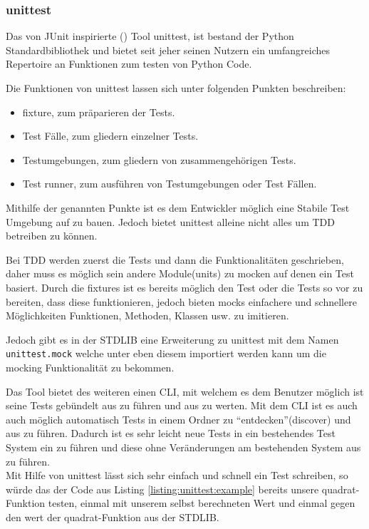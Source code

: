\subsubsection{unittest}\label{python-tools:unittest}

Das von JUnit inspirierte (\cite{docs.python:unittest}) Tool unittest, ist bestand
der Python Standardbibliothek und bietet seit jeher seinen Nutzern ein umfangreiches
Repertoire an Funktionen zum testen von Python Code.

Die Funktionen von unittest lassen sich unter folgenden Punkten beschreiben:
\begin{itemize}
    \item \Gls{fixture}, zum präparieren der Tests.
    \item Test Fälle, zum gliedern einzelner Tests.
    \item Testumgebungen, zum gliedern von zusammengehörigen Tests.
    \item Test runner, zum ausführen von Testumgebungen oder Test Fällen.
\end{itemize}

Mithilfe der genannten Punkte ist es dem Entwickler möglich eine Stabile Test Umgebung
auf zu bauen. Jedoch bietet unittest alleine nicht alles um TDD betreiben zu können.

Bei TDD werden zuerst die Tests und dann die Funktionalitäten geschrieben, daher
muss es möglich sein andere Module(units) zu \gls{mock}en auf denen ein Test basiert.
Durch die \Glspl{fixture} ist es bereits möglich den Test oder die Tests so vor zu
bereiten, dass diese funktionieren, jedoch bieten \Glspl{mock} einfachere und
schnellere Möglichkeiten Funktionen, Methoden, Klassen usw. zu imitieren.

Jedoch gibt es in der STDLIB eine Erweiterung zu unittest mit dem Namen
\lstinline|unittest.mock| welche unter eben diesem importiert werden kann um die \gls{mock}ing Funktionalität
zu bekommen.

Das Tool bietet des weiteren einen CLI, mit welchem es dem Benutzer möglich ist
seine Tests gebündelt aus zu führen und aus zu werten. Mit dem CLI ist es auch
auch möglich automatisch Tests in einem Ordner zu "`entdecken"'(discover) und
aus zu führen. Dadurch ist es sehr leicht neue Tests in ein bestehendes Test
System ein zu führen und diese ohne Veränderungen am bestehenden System aus zu
führen.
\newline
\\
Mit Hilfe von unittest lässt sich sehr einfach und schnell ein Test schreiben,
so würde das der Code aus Listing \ref{listing:unittest:example} bereits unsere
quadrat-Funktion testen, einmal mit unserem selbst berechneten Wert und
einmal gegen den wert der quadrat-Funktion aus der STDLIB.

